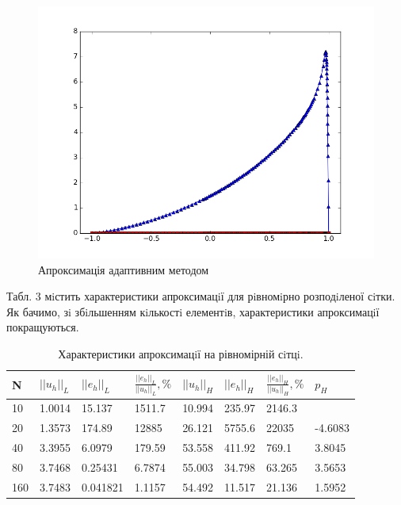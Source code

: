 \documentclass[a4paper]{article}
\numberwithin{equation}{section}
\begin{document}
\begin{figure}[H]
\includegraphics[width=\textwidth]{figure_2.png}
\caption{Апроксимація адаптивним методом}
\end{figure}
Табл. 3 мiстить характеристики апроксимацiї для рiвномiрно розподiленої сiтки. Як бачимо, зi збiльшенням кiлькостi елементiв, характеристики апроксимацiї покращуються.
\begin{table}[H]
\centering
\begin{tabular}{|l|l|l|l|l|l|l|l|}
\hline
N   & $||u_h||_L$ & $||e_h||_L$ & $\frac{||e_h||_L}{||u_h||_L}, \%$ & $||u_h||_H$ & $||e_h||_H$ & $\frac{||e_h||_H}{||u_h||_H}, \%$ & $p_H$   \\ \hline
10  & 1.0014      & 15.137      & 1511.7                            & 10.994      & 235.97      & 2146.3                            &         \\ \hline
20  & 1.3573      & 174.89      & 12885                             & 26.121      & 5755.6      & 22035                             & -4.6083 \\ \hline
40  & 3.3955      & 6.0979      & 179.59                            & 53.558      & 411.92      & 769.1                             & 3.8045  \\ \hline
80  & 3.7468      & 0.25431     & 6.7874                            & 55.003      & 34.798      & 63.265                            & 3.5653  \\ \hline
160 & 3.7483      & 0.041821    & 1.1157                            & 54.492      & 11.517      & 21.136                            & 1.5952  \\ \hline
\end{tabular}
\caption{Характеристики апроксимацiї на рівномірній сiтцi.}
\end{table}
\end{document}
